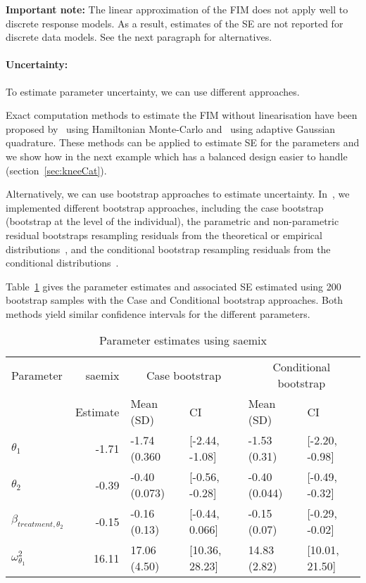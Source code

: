 {\bf Important note:} The linear approximation of the FIM does not apply well to discrete response models. As a result, estimates of the SE are not reported for discrete data models. See the next paragraph for alternatives.

\paragraph{Uncertainty:} To estimate parameter uncertainty, we can use different approaches.

Exact computation methods to estimate the FIM without linearisation have been proposed by~\cite{Riviere16} using Hamiltonian Monte-Carlo and~\cite{Ueckert16} using adaptive Gaussian quadrature. These methods can be applied to estimate SE for the parameters and we show how in the next example which has a balanced design easier to handle (section~\ref{sec:kneeCat}).

Alternatively, we can use bootstrap approaches to estimate uncertainty. In~, we implemented different bootstrap approaches, including the case bootstrap (bootstrap at the level of the individual), the parametric and non-parametric residual bootstraps resampling residuals from the theoretical or empirical distributions~\cite{Thai14}, and the conditional bootstrap resampling residuals from the conditional distributions~\cite{Comets21bootstrap}.

Table~\ref{tab:toenailBootstrapSE} gives the parameter estimates and associated SE estimated using 200 bootstrap samples with the Case and Conditional bootstrap approaches. Both methods yield similar confidence intervals for the different parameters.

\begin{table}[!h]
\centering
\begin{tabular}{lrllll}
  \hline
  Parameter & saemix & \multicolumn{2}{c}{Case bootstrap} & \multicolumn{2}{c}{Conditional bootstrap} \\
 &Estimate & Mean (SD) & CI & Mean (SD) & CI \\ 
  \hline
$\theta_1$ & -1.71 & -1.74 (0.360 & [-2.44, -1.08] & -1.53 (0.31) & [-2.20, -0.98] \\ 
 $\theta_2$ & -0.39 & -0.40 (0.073) & [-0.56, -0.28] & -0.40 (0.044) & [-0.49, -0.32] \\ 
 $\beta_{treatment,\theta_2}$ & -0.15 & -0.16 (0.13) & [-0.44, 0.066] & -0.15 (0.07) & [-0.29, -0.02] \\ 
 $\omega^2_{\theta_1}$ & 16.11 & 17.06 (4.50) & [10.36, 28.23] & 14.83 (2.82) & [10.01, 21.50] \\ 
   \hline
\end{tabular}
\caption{Parameter estimates using {\sf saemix}} \label{tab:toenailBootstrapSE}
\end{table}


